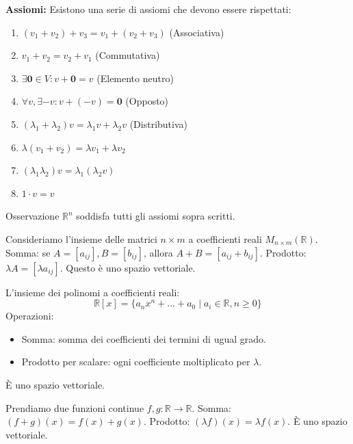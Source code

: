 \textbf{Assiomi:}
Esistono una serie di assiomi che devono essere rispettati:
\begin{enumerate}
    \item $(v_1 + v_2) + v_3 = v_1 + (v_2 + v_3)$ (Associativa)
    \item $v_1 + v_2 = v_2 + v_1$ (Commutativa)
    \item $\exists \mathbf{0} \in V : v + \mathbf{0} = v$ (Elemento neutro)
    \item $\forall v, \exists -v : v + (-v) = \mathbf{0}$ (Opposto)
    \item $(\lambda_1 + \lambda_2)v = \lambda_1 v + \lambda_2 v$ (Distributiva)
    \item $\lambda(v_1 + v_2) = \lambda v_1 + \lambda v_2$
    \item $(\lambda_1 \lambda_2)v = \lambda_1(\lambda_2 v)$
    \item $1 \cdot v = v$
\end{enumerate}

\begin{concept}{Osservazione}
$\mathbb{R}^n$ soddisfa tutti gli assiomi sopra scritti.
\end{concept}

\begin{exercisebox}[title={Esempio: Matrici}]
Consideriamo l'insieme delle matrici $n \times m$ a coefficienti reali $M_{n \times m}(\mathbb{R})$.
Somma: se $A = [a_{ij}], B = [b_{ij}]$, allora $A+B = [a_{ij}+b_{ij}]$.
Prodotto: $\lambda A = [\lambda a_{ij}]$.
Questo è uno spazio vettoriale.
\end{exercisebox}

\begin{exercisebox}[title={Esempio: Polinomi}]
L'insieme dei polinomi a coefficienti reali:
$$ \mathbb{R}[x] = \{ a_n x^n + \dots + a_0 \mid a_i \in \mathbb{R}, n \ge 0 \} $$
Operazioni:
\begin{itemize}
    \item Somma: somma dei coefficienti dei termini di ugual grado.
    \item Prodotto per scalare: ogni coefficiente moltiplicato per $\lambda$.
\end{itemize}
È uno spazio vettoriale.
\end{exercisebox}

\begin{exercisebox}[title={Esempio: Funzioni}]
Prendiamo due funzioni continue $f, g: \mathbb{R} \to \mathbb{R}$.
Somma: $(f+g)(x) = f(x) + g(x)$.
Prodotto: $(\lambda f)(x) = \lambda f(x)$.
È uno spazio vettoriale.
\end{exercisebox}

